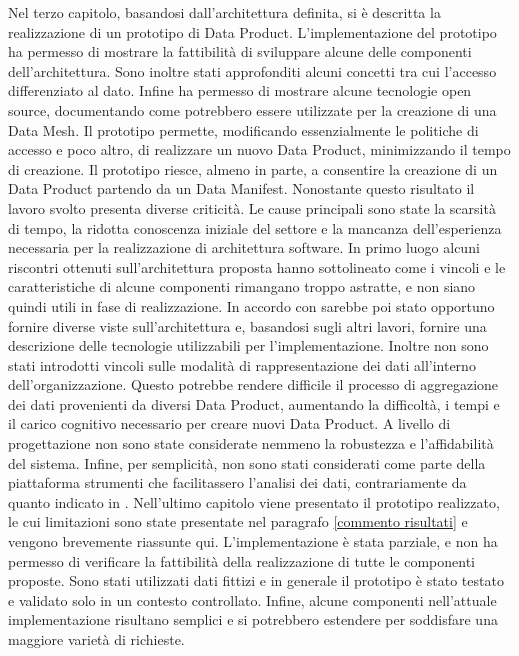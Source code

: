 \documentclass[12pt]{report}
\begin{document}
Nel terzo capitolo, basandosi dall'architettura definita, si è descritta la realizzazione di un prototipo di Data Product.
L'implementazione del prototipo ha permesso di mostrare la fattibilità di sviluppare alcune delle componenti dell'architettura.
Sono inoltre stati approfonditi alcuni concetti tra cui l'accesso differenziato al dato.
Infine ha permesso di mostrare alcune tecnologie open source, documentando come potrebbero essere utilizzate per la creazione di una Data Mesh.
Il prototipo permette, modificando essenzialmente le politiche di accesso e poco altro, di realizzare un nuovo Data Product, minimizzando il tempo di creazione.
Il prototipo riesce, almeno in parte, a consentire la creazione di un Data Product partendo da un Data Manifest.
Nonostante questo risultato il lavoro svolto presenta diverse criticità.
Le cause principali sono state la scarsità di tempo, la ridotta conoscenza iniziale del settore e la mancanza dell'esperienza necessaria per la realizzazione di architettura software.
In primo luogo alcuni riscontri ottenuti sull'architettura proposta hanno sottolineato come i vincoli e le caratteristiche di alcune componenti  rimangano troppo astratte, e non siano quindi utili in fase di realizzazione.
In accordo con \cite{perry_foundations_1992} sarebbe poi stato opportuno fornire diverse viste sull'architettura e, basandosi sugli altri lavori, fornire una descrizione delle tecnologie utilizzabili per l'implementazione.
Inoltre non sono stati introdotti vincoli sulle modalità di rappresentazione dei dati all'interno dell'organizzazione. 
Questo potrebbe rendere difficile il processo di aggregazione dei dati provenienti da diversi Data Product, aumentando la difficoltà, i tempi e il carico cognitivo necessario per creare nuovi Data Product.
A livello di progettazione non sono state considerate nemmeno la robustezza e l'affidabilità del sistema.
Infine, per semplicità, non sono stati considerati come parte della piattaforma strumenti che facilitassero l'analisi dei dati, contrariamente da quanto indicato in \cite{dehghani_data_2022}.
Nell'ultimo capitolo viene presentato il prototipo realizzato,
le cui limitazioni sono state presentate nel paragrafo \ref{commento risultati} e vengono brevemente riassunte qui.
L'implementazione è stata parziale, e non ha permesso di verificare la fattibilità della realizzazione di tutte le componenti proposte.
Sono stati utilizzati dati fittizi e in generale il prototipo è stato testato e validato solo in un contesto controllato.
Infine, alcune componenti nell'attuale implementazione risultano semplici e si potrebbero estendere per soddisfare una maggiore varietà di richieste.
\end{document}
